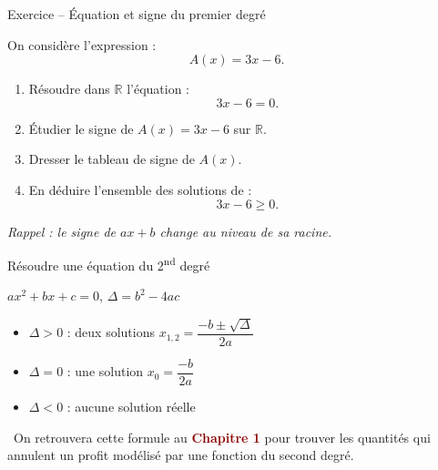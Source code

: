 \documentclass[aspectratio=169,11pt]{beamer}
\newcommand{\important}[1]{\textcolor{DarkRed}{\textbf{#1}}}
\begin{document}
	
	\begin{frame}{Exercice -- Équation et signe du premier degré}
		
		On considère l'expression :
		\[
		A(x)=3x-6.
		\]
		
		\begin{enumerate}
			\item Résoudre dans $\mathbb{R}$ l'équation :
			\[
			3x-6=0.
			\]
			
			\item Étudier le signe de $A(x)=3x-6$ sur $\mathbb{R}$.
			
			\item Dresser le tableau de signe de $A(x)$.
			
			\item En déduire l'ensemble des solutions de :
			\[
			3x-6\geq 0.
			\]
		\end{enumerate}
		
		\vfill
		
		\begin{center}
			\textit{Rappel : le signe de $ax+b$ change au niveau de sa racine.}
		\end{center}
		
	\end{frame}
	
	
	
	\begin{frame}{Résoudre une équation du 2\textsuperscript{nd} degré}
		\begin{definitionbox}
			$ax^2+bx+c=0$, \quad $\Delta=b^2-4ac$
			\begin{itemize}
				\item $\Delta>0$ : deux solutions $x_{1,2}=\dfrac{-b\pm\sqrt{\Delta}}{2a}$
				\item $\Delta=0$ : une solution $x_0=\dfrac{-b}{2a}$
				\item $\Delta<0$ : aucune solution réelle
			\end{itemize}
		\end{definitionbox}
		
		\pause
		\vspace{0.2cm}
		\begin{applicationbox}
			\faBriefcase\ On retrouvera cette formule au \important{Chapitre 1} pour trouver les
			quantités qui annulent un profit modélisé par une fonction du second degré.
		\end{applicationbox}
	\end{frame}
	
	
	
\end{document}
